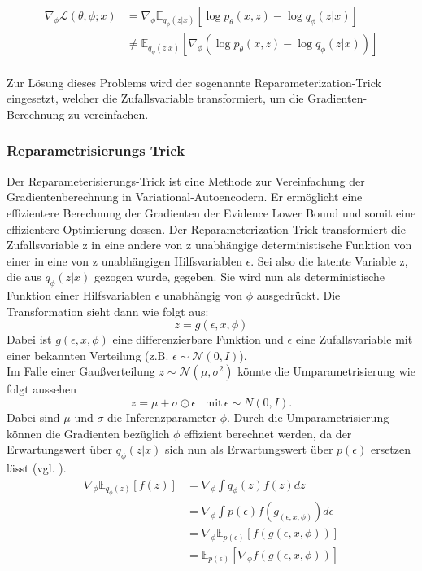 \documentclass[%
thesis=student,%
coverpage=false,%
titlepage=false,%
headmarks=true, %
german,%
font=libertine, %
math=newpxtx, %
BCOR=5mm,%
coverBCOR=11mm%
]{tumbook}
\theoremstyle{break}
\begin{document}
\begin{align}
	\nabla_\phi \mathcal{L}(\theta,\phi;x) &= 	\nabla_\phi \mathbb{E}_{q_\phi(z|x)}\left[\log p_\theta(x,z)- \log q_\phi(z|x)\right] \\
	& \neq \mathbb{E}_{q_\phi(z|x)}\left[\nabla_\phi(\log p_\theta(x,z)- \log q_\phi(z|x))\right]
\end{align}
 \\
Zur Lösung dieses Problems wird der sogenannte Reparameterization-Trick eingesetzt, welcher die Zufallsvariable transformiert, um die Gradienten-Berechnung zu vereinfachen.  
\subsubsection{Reparametrisierungs Trick}
Der Reparameterisierungs-Trick ist eine Methode zur Vereinfachung der Gradientenberechnung in Variational-Autoencodern. Er ermöglicht eine effizientere Berechnung der Gradienten der Evidence Lower Bound und somit eine effizientere Optimierung dessen. Der Reparameterization Trick transformiert die Zufallsvariable z in eine andere von z unabhängige deterministische Funktion von einer in eine  von z unabhängigen Hilfsvariablen $\epsilon$.
Sei also die latente Variable z, die aus $q_\phi(z|x)$ gezogen wurde, gegeben. Sie wird nun als deterministische Funktion einer Hilfsvariablen $\epsilon$ unabhängig von $\phi$ ausgedrückt. 
Die Transformation sieht dann wie folgt aus:
$$ z = g(\epsilon, x, \phi)$$
Dabei ist $g(\epsilon,x,\phi) $ eine differenzierbare Funktion und $\epsilon$ eine Zufallsvariable mit einer bekannten Verteilung (z.B. $\epsilon \sim \mathcal{N}(0,I)$).\\
Im Falle einer Gaußverteilung $z \sim \mathcal{N}(\mu, \sigma^2)$ könnte die Umparametrisierung wie folgt aussehen 
$$z=\mu + \sigma \odot \epsilon \hspace{10pt}\text{mit} \hspace{2pt} \epsilon\sim N(0,I).$$ 
Dabei sind $\mu$ und $\sigma$ die Inferenzparameter $\phi$.  Durch die Umparametrisierung können die Gradienten bezüglich $\phi$ effizient berechnet werden, da der Erwartungswert über $q_\phi(z|x)$ sich nun als Erwartungswert über $p(\epsilon)$ ersetzen lässt (vgl. \cite{MonteCarloEstimation}).
\begin{align}
	\nabla_\phi \mathbb{E}_{q_\phi(z)}[f(z)] &= \nabla_\phi \int q_\phi(z) f(z) dz \\
	&= \nabla_\phi \int p(\epsilon) f(g_(\epsilon,x,\phi)) d\epsilon \\
	&= \nabla_\phi \mathbb{E}_{p(\epsilon)}[f(g(\epsilon,x, \phi))] \\
	& = \mathbb{E}_{p(\epsilon)}[\nabla_\phi f(g(\epsilon,x, \phi))]
\end{align}
\end{document}
